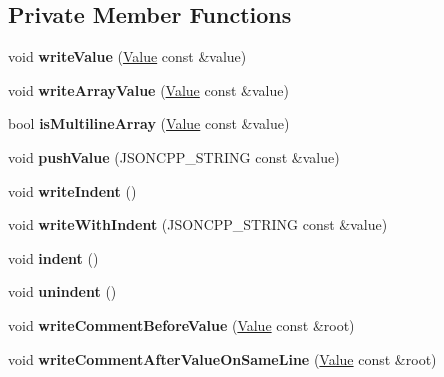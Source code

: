 \subsection*{Private Member Functions}
\begin{DoxyCompactItemize}
\item 
\mbox{\label{structJson_1_1BuiltStyledStreamWriter_a7c9da861861e570a51b45f270c9ff150}} 
void {\bfseries write\+Value} (\hyperlink{classJson_1_1Value}{Value} const \&value)
\item 
\mbox{\label{structJson_1_1BuiltStyledStreamWriter_acd20e9274bbcf7876ef3af2e7d23a31f}} 
void {\bfseries write\+Array\+Value} (\hyperlink{classJson_1_1Value}{Value} const \&value)
\item 
\mbox{\label{structJson_1_1BuiltStyledStreamWriter_a19b675e40051c107115466cdb15a6164}} 
bool {\bfseries is\+Multiline\+Array} (\hyperlink{classJson_1_1Value}{Value} const \&value)
\item 
\mbox{\label{structJson_1_1BuiltStyledStreamWriter_a91e8535508412eea04d77c0cafdf15aa}} 
void {\bfseries push\+Value} (J\+S\+O\+N\+C\+P\+P\+\_\+\+S\+T\+R\+I\+NG const \&value)
\item 
\mbox{\label{structJson_1_1BuiltStyledStreamWriter_a2b38a3714d415c4bd3b4812897130f3d}} 
void {\bfseries write\+Indent} ()
\item 
\mbox{\label{structJson_1_1BuiltStyledStreamWriter_a6e80e1a0d5f64df2ec48c3c3b1284990}} 
void {\bfseries write\+With\+Indent} (J\+S\+O\+N\+C\+P\+P\+\_\+\+S\+T\+R\+I\+NG const \&value)
\item 
\mbox{\label{structJson_1_1BuiltStyledStreamWriter_a73e09692a2cfbd6e67836b060dc34a9f}} 
void {\bfseries indent} ()
\item 
\mbox{\label{structJson_1_1BuiltStyledStreamWriter_a0da6c6f603e00c8c6e38af553edd8c55}} 
void {\bfseries unindent} ()
\item 
\mbox{\label{structJson_1_1BuiltStyledStreamWriter_a32c4afca4e08fba79bb0a80a8010283a}} 
void {\bfseries write\+Comment\+Before\+Value} (\hyperlink{classJson_1_1Value}{Value} const \&root)
\item 
\mbox{\label{structJson_1_1BuiltStyledStreamWriter_a89625b134fce0255263ca40e6125742b}} 
void {\bfseries write\+Comment\+After\+Value\+On\+Same\+Line} (\hyperlink{classJson_1_1Value}{Value} const \&root)
\end{DoxyCompactItemize}
